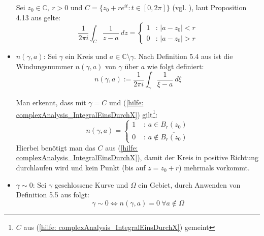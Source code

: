 \documentclass[a4paper,12pt]{report}
\newcommand{\C}{\mathbb C}
\newcommand{\1}{\mathds{1}}
\theoremstyle{plain} %
\theoremstyle{definition} %
\theoremstyle{remark}
\begin{document}
\begin{itemize}
                        Sei $z_0\in\C,\ r>0\text{ und }C=\{z_0+r e^{it}: t\in [0,2\pi]\}$ (vgl. \cite[S. 48]{complexAnalysis}), laut Proposition 4.13 aus \cite[S. 48]{complexAnalysis} gelte:
                        \begin{equation}
                              \label{hilfe: complexAnalysis_IntegralEinsDurchX}
                              \frac{1}{2\pi i}\int_C \frac 1 {z-a}\ dz = \begin{cases}
                                    1 & \text{: } |a-z_0|<r \\
                                    0 & \text{: } |a-z_0|>r
                                    \end{cases}
                        \end{equation}
                  \item $n(\gamma, a)$:
                        Sei $\gamma$ ein Kreis und $a\in \C\setminus \gamma$.
                        Nach Definition 5.4 aus \cite[S. 65]{complexAnalysis} ist die Windungsnummer $n(\gamma,a)$ von $\gamma$ über $a$ wie folgt definiert:
                        $$n(\gamma,a):= \frac{1}{2\pi i}\int_\gamma \frac{1}{\xi-a}\ d\xi$$

                        Man erkennt, dass mit $\gamma = C$  und (\ref{hilfe: complexAnalysis_IntegralEinsDurchX}) gilt\footnote{$C$ aus (\ref{hilfe: complexAnalysis_IntegralEinsDurchX}) gemeint}:
                        \begin{equation}
                              \label{hilfe: complexAnalysis_WindungNullEins}
                              n(\gamma,a) = \begin{cases}
                                    1& \text{ : }a\in B_r(z_0)\\
                                    0& \text{ : }a\notin\overline {B_r(z_0)}
                              \end{cases}
                        \end{equation}
                        Hierbei benötigt man das $C$ aus (\ref{hilfe: complexAnalysis_IntegralEinsDurchX}), damit der Kreis in positive Richtung durchlaufen wird und kein Punkt (bis auf $z=z_0+r$) mehrmals vorkommt.
                  \item $\gamma \sim 0$:
                        Sei $\gamma$ geschlossene Kurve und $\Omega$ ein Gebiet, durch Anwenden von Definition 5.5 aus \cite[S. 67]{complexAnalysis} folgt:
                        $$\gamma \sim 0 \Leftrightarrow n(\gamma, a)=0\ \forall a\notin \Omega$$


\end{itemize}
\end{document}
